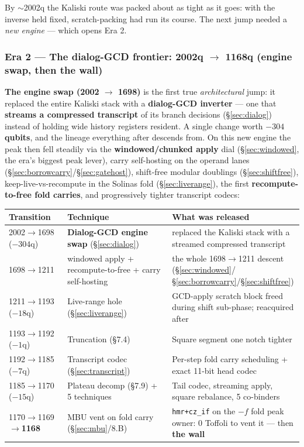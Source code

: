 \documentclass[11pt,a4paper]{article}
\begin{document}
By $\sim$2002q the Kaliski route was packed about as tight as it goes: with the inverse held fixed,
scratch-packing had run its course. The next jump needed a \emph{new engine} --- which opens Era 2.

\subsubsection{Era 2 --- The dialog-GCD frontier: 2002q $\to$ 1168q (engine swap, then the wall)}

\textbf{The engine swap (2002 $\to$ 1698)} is the first true \emph{architectural} jump: it replaced
the entire Kaliski stack with a \textbf{dialog-GCD inverter} --- one that \textbf{streams a compressed
transcript} of its branch decisions (\S\ref{sec:dialog}) instead of holding wide history registers
resident. A single change worth \textbf{$-304$ qubits}, and the lineage everything after descends
from. On this new engine the peak then fell steadily via the \textbf{windowed/chunked apply} dial
(\S\ref{sec:windowed}, the era's biggest peak lever), carry self-hosting on the operand lanes
(\S\ref{sec:borrowcarry}/\S\ref{sec:gatehost}), shift-free modular doublings (\S\ref{sec:shiftfree}),
keep-live-vs-recompute in the Solinas fold (\S\ref{sec:liverange}), the first
\textbf{recompute-to-free fold carries}, and progressively tighter transcript codecs:

\begin{center}
\begin{tabular}{p{3.8cm}p{4.5cm}p{5.2cm}}
\toprule
\textbf{Transition} & \textbf{Technique} & \textbf{What was released} \\
\midrule
2002$\to$1698 ($-304$q) & \textbf{Dialog-GCD engine swap} (\S\ref{sec:dialog}) & replaced the Kaliski stack with a streamed compressed transcript \\
1698$\to$1211 & windowed apply + recompute-to-free + carry self-hosting & the whole 1698$\to$1211 descent (\S\ref{sec:windowed}/\S\ref{sec:borrowcarry}/\S\ref{sec:shiftfree}) \\
1211$\to$1193 ($-18$q) & Live-range hole (\S\ref{sec:liverange}) & GCD-apply scratch block freed during shift sub-phase; reacquired after \\
1193$\to$1192 ($-1$q) & Truncation (\S7.4) & Square segment one notch tighter \\
1192$\to$1185 ($-7$q) & Transcript codec (\S\ref{sec:transcript}) & Per-step fold carry scheduling + exact 11-bit head codec \\
1185$\to$1170 ($-15$q) & Plateau decomp (\S7.9) + 5 techniques & Tail codec, streaming apply, square rebalance, 5 co-binders \\
1170$\to$1169$\to$\textbf{1168} & MBU vent on fold carry (\S\ref{sec:mbu}/8.B) & \texttt{hmr+cz\_if} on the $-f$ fold peak owner: 0 Toffoli to vent it --- then \textbf{the wall} \\
\bottomrule
\end{tabular}
\end{center}
\end{document}
